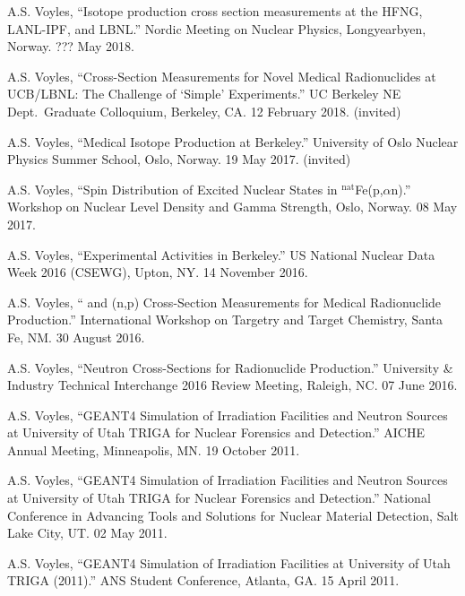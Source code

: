 \begin{bibsection}

\item A.S. Voyles, \enquote{Isotope production cross section measurements at the HFNG, LANL-IPF, and LBNL.}    Nordic Meeting on Nuclear Physics, Longyearbyen, Norway. ??? May 2018.

\item A.S. Voyles, \enquote{Cross-Section Measurements for Novel Medical Radionuclides at UCB/LBNL: The Challenge of \enquote{Simple} Experiments.} UC Berkeley NE Dept.\ Graduate Colloquium, Berkeley, CA. 12 February 2018. (invited)

\item A.S. Voyles, \enquote{Medical Isotope Production at Berkeley.} University of Oslo Nuclear Physics Summer School, Oslo, Norway.  19 May 2017. (invited)

\item A.S. Voyles, \enquote{Spin Distribution of Excited Nuclear States in $^{\text{nat}}$Fe(p,$\alpha$n).}  Workshop on Nuclear Level Density and Gamma Strength, Oslo, Norway. 08 May 2017.


\item A.S. Voyles, \enquote{Experimental Activities in Berkeley.} US National Nuclear Data Week 2016 (CSEWG), Upton, NY. 14 November 2016.


\item A.S. Voyles, \enquote{ and  (n,p) Cross-Section Measurements for Medical Radionuclide Production.}  International Workshop on Targetry and Target Chemistry, Santa Fe, NM. 30 August 2016.

\item A.S. Voyles, \enquote{Neutron Cross-Sections for Radionuclide Production.}  University \& Industry Technical Interchange 2016 Review Meeting, Raleigh, NC. 07 June 2016.

\item A.S. Voyles, \enquote{GEANT4 Simulation of Irradiation Facilities and Neutron Sources at University of Utah TRIGA for
Nuclear Forensics and Detection.}  AICHE Annual Meeting, Minneapolis, MN. 19 October 2011.

\item A.S. Voyles, \enquote{GEANT4 Simulation of Irradiation Facilities and Neutron Sources at University of Utah TRIGA for
Nuclear Forensics and Detection.}   National Conference in Advancing Tools and Solutions for
Nuclear Material Detection, Salt Lake City, UT. 02 May 2011.

\item A.S. Voyles, \enquote{GEANT4 Simulation of Irradiation Facilities at University of Utah TRIGA (2011).} 
ANS Student Conference, Atlanta, GA. 15 April 2011.

\end{bibsection}

